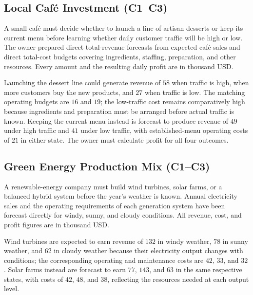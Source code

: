 
	\subsection{Local Café Investment (C1--C3)}
	\label{sec:problem3-local-cafe-investment-c1-c3}

	A small café must decide whether to launch a line of artisan desserts or keep its current menu before learning whether daily customer traffic will be high or low. The owner prepared direct total-revenue forecasts from expected café sales and direct total-cost budgets covering ingredients, staffing, preparation, and other resources. Every amount and the resulting daily profit are in thousand USD.

	Launching the dessert line could generate revenue of \(58\) when traffic is high, when more customers buy the new products, and \(27\) when traffic is low. The matching operating budgets are \(16\) and \(19\); the low-traffic cost remains comparatively high because ingredients and preparation must be arranged before actual traffic is known. Keeping the current menu instead is forecast to produce revenue of \(49\) under high traffic and \(41\) under low traffic, with established-menu operating costs of \(21\) in either state. The owner must calculate profit for all four outcomes.

	\subsection{Green Energy Production Mix (C1--C3)}
	\label{sec:problem4-green-energy-production-mix-c1-c3}

	A renewable-energy company must build wind turbines, solar farms, or a balanced hybrid system before the year's weather is known. Annual electricity sales and the operating requirements of each generation system have been forecast directly for windy, sunny, and cloudy conditions. All revenue, cost, and profit figures are in thousand USD.

	Wind turbines are expected to earn revenue of \(132\) in windy weather, \(78\) in sunny weather, and \(62\) in cloudy weather because their electricity output changes with conditions; the corresponding operating and maintenance costs are \(42\), \(33\), and \(32\). Solar farms instead are forecast to earn \(77\), \(143\), and \(63\) in the same respective states, with costs of \(42\), \(48\), and \(38\), reflecting the resources needed at each output level.

